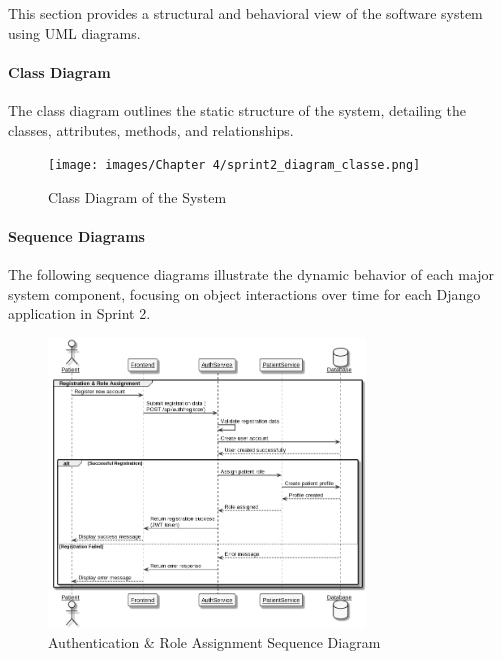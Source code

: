 This section provides a structural and behavioral view of the software system using UML diagrams.

\paragraph{Class Diagram}

The class diagram outlines the static structure of the system, detailing the classes, attributes, methods, and relationships.

\begin{figure}[H]
    \centering
    \texttt{[image: images/Chapter 4/sprint2\_diagram\_classe.png]}
    \caption{Class Diagram of the System}
    \label{fig:class-diagram}
\end{figure}

\paragraph{Sequence Diagrams}

The following sequence diagrams illustrate the dynamic behavior of each major system component, focusing on object interactions over time for each Django application in Sprint 2.

\begin{figure}[H]
    \centering
    \includegraphics[width=0.75\textwidth]{Auth_Sequence_Diagram.png}
    \caption{Authentication \& Role Assignment Sequence Diagram}
    \label{fig:auth-sequence-diagram}
\end{figure}

